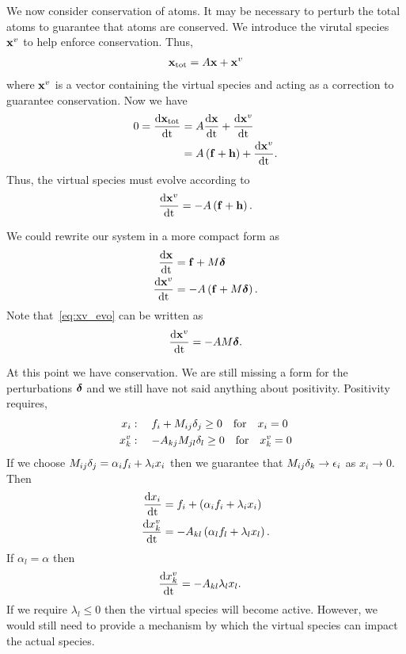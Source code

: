 We now consider conservation of atoms.  It may be necessary to perturb
the total atoms to guarantee that atoms are conserved.  We introduce 
the virutal species $\mathbf{x}^{v}$ to help enforce conservation.  Thus, 
\begin{align}
  \mathbf{x}_{\textrm{tot}} = A\mathbf{x} + \mathbf{x}^{v}
\end{align}
where $\mathbf{x}^{v}$ is a vector containing the virtual species and acting 
as a correction to guarantee conservation.  Now we have 
\begin{align}
  0 = \frac{\mathrm{d} \mathbf{x}_{\textrm{tot}}}{\mathrm{d} \mathrm{t}} &= A\frac{\mathrm{d} \mathbf{x}}{\mathrm{d} \mathrm{t}} + 
       \frac{\mathrm{d} \mathbf{x}^{v}}{\mathrm{d} \mathrm{t}} \\
    &= A\left(\mathbf{f} + \mathbf{h}\right) + \frac{\mathrm{d} \mathbf{x}^{v}}{\mathrm{d} \mathrm{t}}.
\end{align}
Thus, the virtual species must evolve according to 
\begin{align}
  \frac{\mathrm{d} \mathbf{x}^{v}}{\mathrm{d} \mathrm{t}} = -A\left(\mathbf{f} + \mathbf{h}\right).
\end{align}

We could rewrite our system in a more compact form as 
\begin{align}
  \frac{\mathrm{d} \mathbf{x}}{\mathrm{d} \mathrm{t}} &= \mathbf{f} + M\boldsymbol{\delta} \label{eq:gen_inad} \\
  \frac{\mathrm{d} \mathbf{x}^{v}}{\mathrm{d} \mathrm{t}} &= -A\left(\mathbf{f} + M\boldsymbol{\delta}\right) \label{eq:xv_evo}.
\end{align}
Note that~\eqref{eq:xv_evo} can be written as 
\begin{align}
  \frac{\mathrm{d} \mathbf{x}^{v}}{\mathrm{d} \mathrm{t}} = -AM\boldsymbol{\delta}.
\end{align}

At this point we have conservation.  We are still missing a form 
for the perturbations $\boldsymbol{\delta}$ and we still have not said anything 
about positivity.  Positivity requires,
\begin{align}
  x_{i}    &: \quad f_{i} + M_{ij}\delta_{j} \geq 0 
       \quad \textrm{for} \quad x_{i} = 0 \\
  x_{k}^{v}&: \quad -A_{kj}M_{jl}\delta_{l} \geq 0 
       \quad \textrm{for} \quad x_{k}^{v} = 0
\end{align}
If we choose $M_{ij}\delta_{j} = \alpha_{i}f_{i} + \lambda_{i}x_{i}$ 
then we guarantee that $M_{ij}\delta_{k} \to \epsilon_{i}$ as 
$x_{i} \to 0$.  Then 
\begin{align}
  \frac{\mathrm{d} x_{i}}{\mathrm{d} \mathrm{t}} &= f_{i} + \left(\alpha_{i}f_{i} + \lambda_{i}x_{i}\right) \\
  \frac{\mathrm{d} x_{k}^{v}}{\mathrm{d} \mathrm{t}} &= -A_{kl}\left(\alpha_{l}f_{l} + \lambda_{l}x_{l}\right).
\end{align}
If $\alpha_{l} = \alpha$ then 
\begin{align}
  \frac{\mathrm{d} x_{k}^{v}}{\mathrm{d} \mathrm{t}} &= -A_{kl}\lambda_{l}x_{l}.
\end{align}
If we require $\lambda_{l} \leq 0$ then the virtual species 
will become active.  However, we would still need to provide 
a mechanism by which the virtual species can impact the 
actual species.

